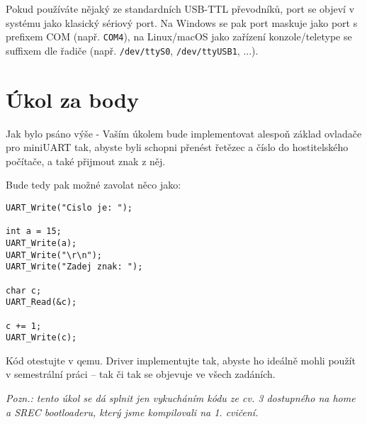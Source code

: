 \documentclass{article}
\begin{document}
Pokud používáte nějaký ze standardních USB-TTL převodníků, port se objeví v systému jako klasický sériový port. Na Windows se pak port maskuje jako port s prefixem COM (např. \texttt{COM4}), na Linux/macOS jako zařízení konzole/teletype se suffixem dle řadiče (např. \texttt{/dev/ttyS0}, \texttt{/dev/ttyUSB1}, ...).

\section{Úkol za body}

Jak bylo psáno výše - Vaším úkolem bude implementovat alespoň základ ovladače pro miniUART tak, abyste byli schopni přenést řetězec a číslo do hostitelského počítače, a také přijmout znak z něj.

Bude tedy pak možné zavolat něco jako:

\begin{lstlisting}
UART_Write("Cislo je: ");

int a = 15;
UART_Write(a);
UART_Write("\r\n");
UART_Write("Zadej znak: ");

char c;
UART_Read(&c);

c += 1;
UART_Write(c);
\end{lstlisting}

Kód otestujte v qemu. Driver implementujte tak, abyste ho ideálně mohli použít v semestrální práci -- tak či tak se objevuje ve všech zadáních.

\emph{Pozn.: tento úkol se dá splnit jen vykucháním kódu ze cv. 3 dostupného na home a SREC bootloaderu, který jsme kompilovali na 1. cvičení.}
\end{document}
